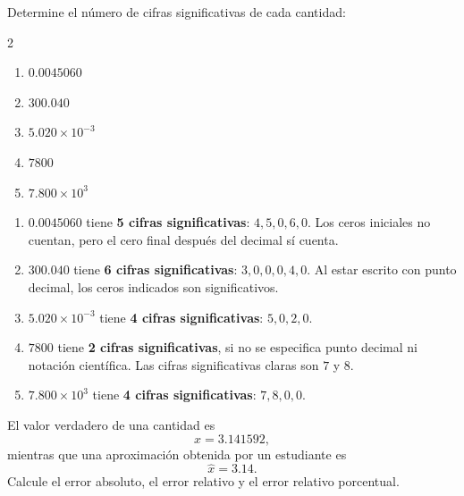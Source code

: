 \documentclass[11pt,respuestas,a4]{aleph-examen}
\begin{document}
\begin{preguntas}




\item
Determine el número de cifras significativas de cada cantidad: 
\begin{multicols}{2}
    \begin{enumerate}[label=\alph*)]
        \item $0.0045060$
        \item $300.040$
        \item $5.020\times 10^{-3}$
        \item $7800$
        \item $7.800\times 10^3$
    \end{enumerate}
    \end{multicols}

\begin{respuesta}
\begin{enumerate}[label=\alph*)]
    \item $0.0045060$ tiene \textbf{5 cifras significativas}: $4,5,0,6,0$. Los ceros iniciales no cuentan, pero el cero final después del decimal sí cuenta.
    
    \item $300.040$ tiene \textbf{6 cifras significativas}: $3,0,0,0,4,0$. Al estar escrito con punto decimal, los ceros indicados son significativos.
    
    \item $5.020\times 10^{-3}$ tiene \textbf{4 cifras significativas}: $5,0,2,0$.
    
    \item $7800$ tiene \textbf{2 cifras significativas}, si no se especifica punto decimal ni notación científica. Las cifras significativas claras son $7$ y $8$.
    
    \item $7.800\times 10^3$ tiene \textbf{4 cifras significativas}: $7,8,0,0$.
\end{enumerate}
\end{respuesta}


\item
El valor verdadero de una cantidad es  
\[
x=3.141592,
\]
mientras que una aproximación obtenida por un estudiante es
\[
\hat{x}=3.14.
\]
Calcule el error absoluto, el error relativo y el error relativo porcentual.


\end{preguntas}
\end{document}
